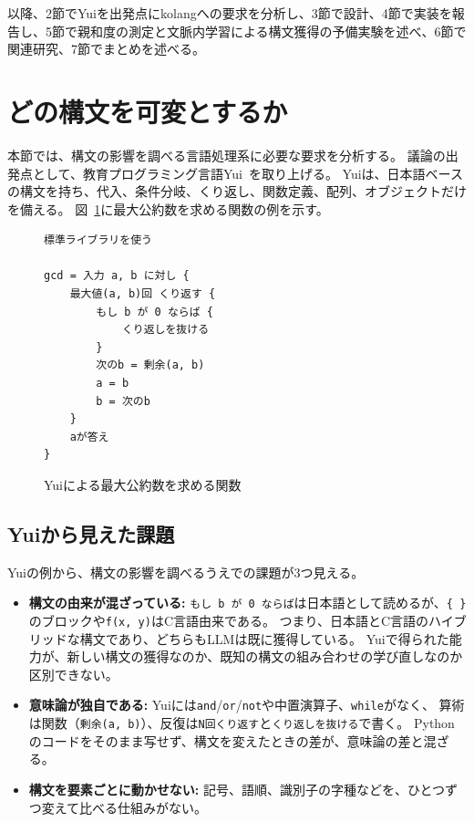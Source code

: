 \documentclass{ipsjprosym}
\begin{document}
以降、2節でYuiを出発点にkolangへの要求を分析し、3節で設計、4節で実装を報告し、5節で親和度の測定と文脈内学習による構文獲得の予備実験を述べ、6節で関連研究、7節でまとめを述べる。


\section{どの構文を可変とするか}
\label{sec:requirements}

本節では、構文の影響を調べる言語処理系に必要な要求を分析する。
議論の出発点として、教育プログラミング言語Yui~\cite{Kuramitsu2026Nanako}を取り上げる。
Yuiは、日本語ベースの構文を持ち、代入、条件分岐、くり返し、関数定義、配列、オブジェクトだけを備える。
図~\ref{fig:yui-sample}に最大公約数を求める関数の例を示す。

\begin{figure}[t]
\centering
\begin{verbatim}
標準ライブラリを使う

gcd = 入力 a, b に対し {
    最大値(a, b)回 くり返す {
        もし b が 0 ならば {
            くり返しを抜ける
        }
        次のb = 剰余(a, b)
        a = b
        b = 次のb
    }
    aが答え
}
\end{verbatim}
\caption{Yuiによる最大公約数を求める関数}
\label{fig:yui-sample}
\end{figure}

\subsection{Yuiから見えた課題}

Yuiの例から、構文の影響を調べるうえでの課題が3つ見える。

\begin{itemize}
  \item \textbf{構文の由来が混ざっている:}
    \verb|もし b が 0 ならば|は日本語として読めるが、\verb|{ }|のブロックや\verb|f(x, y)|はC言語由来である。
    つまり、日本語とC言語のハイブリッドな構文であり、どちらもLLMは既に獲得している。
    Yuiで得られた能力が、新しい構文の獲得なのか、既知の構文の組み合わせの学び直しなのか区別できない。
  \item \textbf{意味論が独自である:}
    Yuiには\verb|and|/\verb|or|/\verb|not|や中置演算子、\verb|while|がなく、
    算術は関数（\verb|剰余(a, b)|）、反復は\verb|N回くり返す|と\verb|くり返しを抜ける|で書く。
    Pythonのコードをそのまま写せず、構文を変えたときの差が、意味論の差と混ざる。
  \item \textbf{構文を要素ごとに動かせない:}
    記号、語順、識別子の字種などを、ひとつずつ変えて比べる仕組みがない。
\end{itemize}
\end{document}
